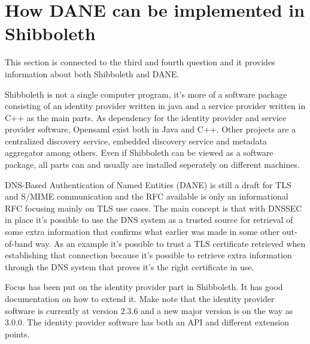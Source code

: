 \section{How DANE can be implemented in Shibboleth}
This section is connected to the third and fourth question and it provides information about both Shibboleth and DANE.

Shibboleth is not a single computer program, it's more of a software package consisting of an identity provider written in java and a service provider written in C++ as the main parts.
As dependency for the identity provider and service provider software, Opensaml exist both in Java and C++.
Other projects are a centralized discovery service, embedded discovery service and  metadata aggregator among others.
Even if Shibboleth can be viewed as a software package, all parts can and usually are installed seperately on different machines.

DNS-Based Authentication of Named Entities (DANE) is still a draft for TLS and S/MIME communication and the RFC available is only an informational RFC focusing mainly on TLS use cases.
The main concept is that with DNSSEC in place it's possible to use the DNS system as a trusted source for retrieval of some extra information that confirms what earlier was made in some other out-of-band way.
As an example it's possible to trust a TLS certificate retrieved when establishing that connection because it's possible to retrieve extra information through the DNS system that proves it's the right certificate in use.

Focus has been put on the identity provider part in Shibboleth.
It has good documentation on how to extend it. 
Make note that the identity provider software is currently at version 2.3.6 and a new major version is on the way as 3.0.0.
The identity provider software has both an API and different extension points.





